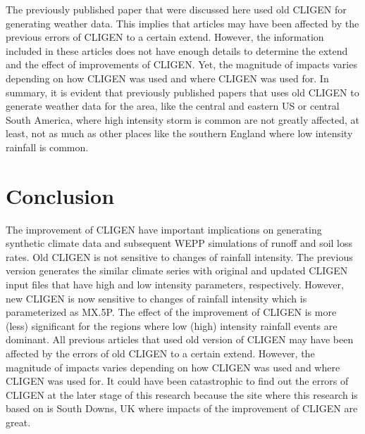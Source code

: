 The previously published paper that were discussed here used old CLIGEN for
generating weather data. This implies that articles may have been affected by
the previous errors of CLIGEN to a certain extend. However, the information
included in these articles does not have enough details to determine the extend
and the effect of improvements of CLIGEN. Yet, the magnitude of impacts varies
depending on how CLIGEN was used and where CLIGEN was used for. In summary,
it is evident that previously published papers that uses old CLIGEN to
generate weather data for the area, like the central and eastern US or central
South America, where high intensity storm is common are not greatly affected,
at least, not as much as other places like the southern England where low
intensity rainfall is common.

\section{Conclusion}
\label{sec:ImprovedCLIGENConclusion}
The improvement of CLIGEN have important implications on generating synthetic
climate data and subsequent WEPP simulations of runoff and soil loss rates. Old
CLIGEN is not sensitive to changes of rainfall intensity. The previous version
generates the similar climate series with original and updated CLIGEN input
files that have high and low intensity parameters, respectively. However, new
CLIGEN is now sensitive to changes of rainfall intensity which is parameterized
as {MX.5P}. The effect of the improvement of CLIGEN is more (less) significant
for the regions where low (high) intensity rainfall events are dominant.
All previous articles that used old version of CLIGEN may have been affected by
the errors of old CLIGEN to a certain extend. However, the magnitude of impacts
varies depending on how CLIGEN was used and where CLIGEN was used for. It could
have been catastrophic to find out the errors of CLIGEN at the later stage of
this research because the site where this research is based on is South Downs,
UK where impacts of the improvement of CLIGEN are great.


